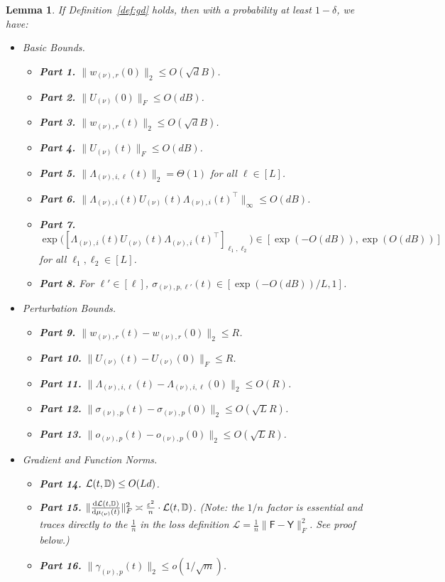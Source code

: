 \documentclass[11pt]{article}
\theoremstyle{plain}
\newtheorem{lemma}[theorem]{Lemma}
\renewcommand{\d}{\mathrm{d}}
\begin{document}
\begin{lemma}
    If Definition~\ref{def:gd} holds, then with a probability at least $1 - \delta$, we have:
    \begin{itemize}
        \item {\rm Basic Bounds.}
        \begin{itemize}
            \item {\bf Part 1.} $\| w_{(\nu), r}(0) \|_2 \leq O(\sqrt{d}B)$.
            \item {\bf Part 2.} $\| U_{(\nu)}(0) \|_F \leq O(dB)$.
            \item {\bf Part 3.} $\| w_{(\nu), r}(t) \|_2 \leq O(\sqrt{d}B)$.
            \item {\bf Part 4.} $\| U_{(\nu)}(t) \|_F \leq O(dB)$.
            \item {\bf Part 5.} $\| \Lambda_{(\nu), i, \ell}(t) \|_2 = \Theta(1)$ for all $\ell \in [L]$.
            \item {\bf Part 6.} $\| \Lambda_{(\nu), i}(t) U_{(\nu)}(t) \Lambda_{(\nu), i}(t)^\top \|_\infty \leq O(dB)$.
            \item {\bf Part 7.} $ \exp\big( [\Lambda_{(\nu), i}(t) U_{(\nu)}(t) \Lambda_{(\nu), i}(t)^\top]_{\ell_1, \ell_2} \big) \in [ \exp(-O(dB)), \exp(O(dB)) ]$ for all $\ell_1, \ell_2 \in [L]$.
            \item {\bf Part 8.} For  $\ell'\in [\ell]$, $ \sigma_{(\nu), p, \ell'}(t) \in [\exp(-O(dB)) / L, 1]$.
        \end{itemize}
        \item {\rm Perturbation Bounds.}
        \begin{itemize}
            \item {\bf Part 9.} $\| w_{(\nu), r}(t) - w_{(\nu), r}(0) \|_2 \leq R$.
            \item {\bf Part 10.} $\| U_{(\nu)}(t) - U_{(\nu)}(0)\|_F \leq R$.
            \item {\bf Part 11.} $\| \Lambda_{(\nu), i, \ell}(t) - \Lambda_{(\nu), i, \ell}(0)\|_2 \leq O(R)$.
            \item {\bf Part 12.} $\| \sigma_{(\nu), p}(t) - \sigma_{(\nu), p}(0) \|_2 \leq O(\sqrt{L}R)$.
            \item {\bf Part 13.} $\| o_{(\nu), p}(t) - o_{(\nu), p}(0) \|_2 \leq O(\sqrt{L}R)$.
        \end{itemize}
        \item {\rm Gradient and Function Norms.}
        \begin{itemize}
            \item {\bf Part 14.} ${\cal L}(t, \mathbb{D}) \leq O(Ld)$.
            \item {\bf Part 15.} $\| \frac{\d {\cal L}(t, \mathbb{D})}{\d \mu_{(\nu)}(t)} \|_F^2 \asymp \frac{\varepsilon^2}{n} \cdot {\cal L}(t, \mathbb{D})$. {\it (Note: the $1/n$ factor is essential and traces directly to the $\frac{1}{n}$ in the loss definition $\mathcal{L} = \frac{1}{n}\|\mathsf{F}-\mathsf{Y}\|_F^2$. See proof below.)}
            \item {\bf Part 16.} $\| \gamma_{(\nu), p}(t) \|_2 \leq o(1/\sqrt{m})$.
        \end{itemize}
    \end{itemize}
\end{lemma}
\end{document}
